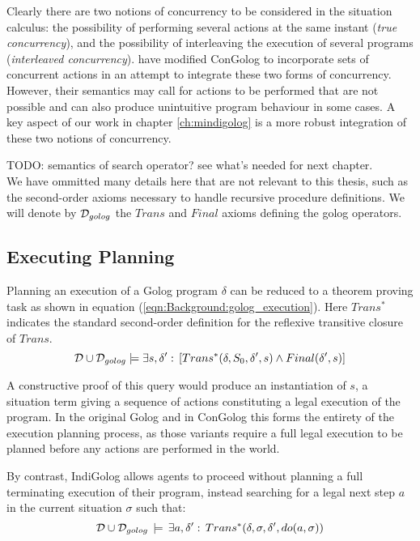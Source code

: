 Clearly there are two notions of concurrency to be considered in the
situation calculus: the possibility of performing several actions
at the same instant (\emph{true concurrency}), and the possibility
of interleaving the execution of several programs (\emph{interleaved
concurrency}). \citet{pinto99tcongolog} have modified ConGolog to
incorporate sets of concurrent actions in an attempt to integrate
these two forms of concurrency. However, their semantics may call
for actions to be performed that are not possible and can also produce
unintuitive program behaviour in some cases. A key aspect of our work
in chapter \ref{ch:mindigolog} is a more robust integration of these
two notions of concurrency.

TODO: semantics of search operator? see what's needed for next chapter.\\


We have ommitted many details here that are not relevant to this thesis,
such as the second-order axioms necessary to handle recursive procedure
definitions. We will denote by $\mathcal{D}_{golog}$ the $Trans$ and $Final$
axioms defining the golog operators.


\subsection{Executing Planning}

Planning an execution of a Golog program $\delta$ can be reduced
to a theorem proving task as shown in equation (\ref{eqn:Background:golog_execution}).
Here $Trans^{*}$ indicates the standard second-order definition for
the reflexive transitive closure of $Trans$.\begin{equation}
\mathcal{D}\cup\mathcal{D}_{golog}\models\exists s,\delta':\,\left[Trans^{*}(\delta,S_{0},\delta',s)\wedge Final(\delta',s)\right]\label{eqn:Background:golog_execution}\end{equation}
 

A constructive proof of this query would produce an instantiation
of $s$, a situation term giving a sequence of actions constituting
a legal execution of the program. In the original Golog and in ConGolog
this forms the entirety of the execution planning process, as those
variants require a full legal execution to be planned before any actions
are performed in the world.

By contrast, IndiGolog allows agents to proceed without planning a
full terminating execution of their program, instead searching for
a legal next step $a$ in the current situation $\sigma$ such that:\[
\mathcal{D}\cup\mathcal{D}_{golog}\,\models\,\exists a,\delta':\, Trans^{*}(\delta,\sigma,\delta',do(a,\sigma))\]


